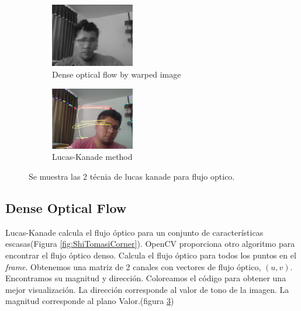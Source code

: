 \begin{figure}[h!]

  \begin{subfigure}[]{0.4\linewidth}
      \centering
      \includegraphics[width=0.4\textwidth]{Kap3/img/Dense_optical_flow_by_warped_image.png}
      \caption{Dense optical flow by warped image}
      \label{fig:Dense_optical_flow_by_warped_image}
  \end{subfigure}
  
    \begin{subfigure}[]{0.4\linewidth}
      \centering
      \includegraphics[width=0.4\textwidth]{Kap3/img/Lucas-Kanade_method.png}
      \caption{Lucas-Kanade method}
      \label{fig:Lucas-Kanade_method}
  \end{subfigure}
  
  \caption{Se muestra las 2 técnia de lucas kanade para flujo optico.}
  \label{fig:optical-flow1}
\end{figure}



\subsection{Dense Optical Flow}
Lucas-Kanade calcula el flujo óptico para un conjunto de características escasas(Figura \ref{fig:ShiTomasiCorner}). OpenCV proporciona otro algoritmo para encontrar el flujo óptico denso. Calcula el flujo óptico para todos los puntos en el \textit{frame}. Obtenemos una matriz de 2 canales con vectores de flujo óptico,\textbf{ $(u, v)$}. Encontramos su magnitud y dirección. Coloreamos el código para obtener una mejor visualización. La dirección corresponde al valor de tono de la imagen. La magnitud corresponde al plano Valor.(figura \ref{fig:optical-flow1})



